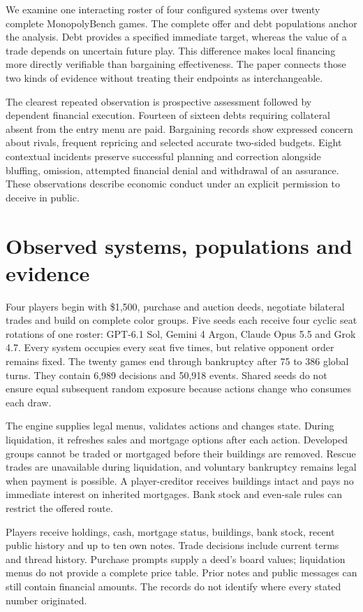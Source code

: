 \documentclass[11pt,letterpaper]{article}
\begin{document}
We examine one interacting roster of four configured systems over twenty complete MonopolyBench games. The complete offer and debt populations anchor the analysis. Debt provides a specified immediate target, whereas the value of a trade depends on uncertain future play. This difference makes local financing more directly verifiable than bargaining effectiveness. The paper connects those two kinds of evidence without treating their endpoints as interchangeable.

The clearest repeated observation is prospective assessment followed by dependent financial execution. Fourteen of sixteen debts requiring collateral absent from the entry menu are paid. Bargaining records show expressed concern about rivals, frequent repricing and selected accurate two-sided budgets. Eight contextual incidents preserve successful planning and correction alongside bluffing, omission, attempted financial denial and withdrawal of an assurance. These observations describe economic conduct under an explicit permission to deceive in public.

\section{Observed systems, populations and evidence}
Four players begin with \$1,500, purchase and auction deeds, negotiate bilateral trades and build on complete color groups. Five seeds each receive four cyclic seat rotations of one roster: GPT-6.1 Sol, Gemini 4 Argon, Claude Opus 5.5 and Grok 4.7. Every system occupies every seat five times, but relative opponent order remains fixed. The twenty games end through bankruptcy after 75 to 386 global turns. They contain 6,989 decisions and 50,918 events. Shared seeds do not ensure equal subsequent random exposure because actions change who consumes each draw.

The engine supplies legal menus, validates actions and changes state. During liquidation, it refreshes sales and mortgage options after each action. Developed groups cannot be traded or mortgaged before their buildings are removed. Rescue trades are unavailable during liquidation, and voluntary bankruptcy remains legal when payment is possible. A player-creditor receives buildings intact and pays no immediate interest on inherited mortgages. Bank stock and even-sale rules can restrict the offered route.

Players receive holdings, cash, mortgage status, buildings, bank stock, recent public history and up to ten own notes. Trade decisions include current terms and thread history. Purchase prompts supply a deed's board values; liquidation menus do not provide a complete price table. Prior notes and public messages can still contain financial amounts. The records do not identify where every stated number originated.
\end{document}

